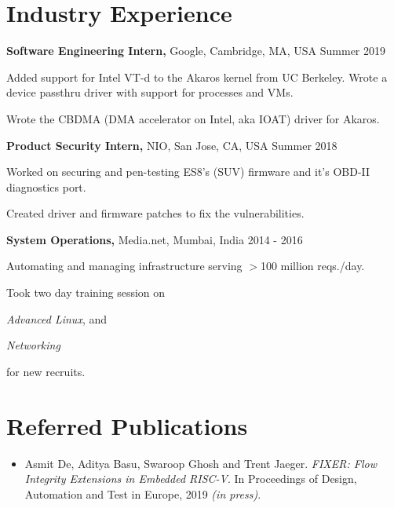 \documentclass[margin]{res}
\begin{document}
\begin{resume}
\section{Industry Experience}

{\bf Software Engineering Intern,} Google, Cambridge, MA, USA
\hfill Summer  2019 %
\begin{itemizeexp}
    \item Added support for Intel VT-d to the Akaros kernel from UC Berkeley.
    Wrote a device passthru driver with support for processes and VMs.
    \item Wrote the CBDMA (DMA accelerator on Intel, aka IOAT) driver for
    Akaros.
\end{itemizeexp}

{\bf Product Security Intern,} NIO, San Jose, CA, USA
\hfill Summer 2018 %
\begin{itemizeexp}
    \item Worked on securing and pen-testing ES8's (SUV) firmware and it's OBD-II diagnostics port.
    \item Created driver and firmware patches to fix the vulnerabilities.
\end{itemizeexp}

{\bf System Operations,} Media.net, Mumbai, India
\hfill 2014 - 2016 %
\begin{itemizeexp}
    \item Automating and managing infrastructure serving $>$100 million reqs./day.
    \item Took two day training session on 
    \begin{enumerate*}[label=(\roman*)]
      \item \textit{Advanced Linux}, and
      \item \textit{Networking}
    \end{enumerate*}
     for new recruits.
\end{itemizeexp}

\section{Referred Publications}
\begin{itemize}
\item
    Asmit De, Aditya Basu, Swaroop Ghosh and Trent Jaeger.
    \emph{FIXER: Flow Integrity Extensions in Embedded RISC-V}.
    In Proceedings of Design, Automation and Test in Europe, 2019 \emph{(in press)}.


\end{itemize}
\end{resume}
\end{document}
